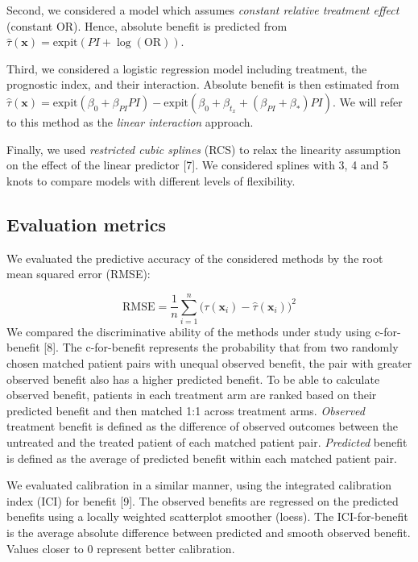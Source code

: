 \documentclass{article}
\begin{document}
Second, we considered a model which assumes \emph{constant relative
treatment effect} (constant OR). Hence, absolute benefit is predicted
from \(\hat{\tau}(\bm{x}) = \text{expit}(PI +\log(\text{OR}))\).

Third, we considered a logistic regression model including treatment,
the prognostic index, and their interaction. Absolute benefit is then
estimated from
\(\hat{\tau}(\bm{x})=\text{expit}(\beta_0+\beta_{PI}PI) - \text{expit}(\beta_0+\beta_{t_x}+(\beta_{PI}+\beta_*)PI)\).
We will refer to this method as the \emph{linear interaction} approach.

Finally, we used \emph{restricted cubic splines} (RCS) to relax the
linearity assumption on the effect of the linear predictor {[}7{]}. We
considered splines with 3, 4 and 5 knots to compare models with
different levels of flexibility.

\hypertarget{evaluation-metrics}{%
\subsection{Evaluation metrics}\label{evaluation-metrics}}

We evaluated the predictive accuracy of the considered methods by the
root mean squared error (RMSE):

\[\text{RMSE}=\frac{1}{n}\sum_{i=1}^n\big(\tau(\bm{x}_i) - \hat{\tau}(\bm{x}_i)\big)^2\]
We compared the discriminative ability of the methods under study using
c-for-benefit {[}8{]}. The c-for-benefit represents the probability that
from two randomly chosen matched patient pairs with unequal observed
benefit, the pair with greater observed benefit also has a higher
predicted benefit. To be able to calculate observed benefit, patients in
each treatment arm are ranked based on their predicted benefit and then
matched 1:1 across treatment arms. \emph{Observed} treatment benefit is
defined as the difference of observed outcomes between the untreated and
the treated patient of each matched patient pair. \emph{Predicted}
benefit is defined as the average of predicted benefit within each
matched patient pair.

We evaluated calibration in a similar manner, using the integrated
calibration index (ICI) for benefit {[}9{]}. The observed benefits are
regressed on the predicted benefits using a locally weighted scatterplot
smoother (loess). The ICI-for-benefit is the average absolute difference
between predicted and smooth observed benefit. Values closer to \(0\)
represent better calibration.
\end{document}
